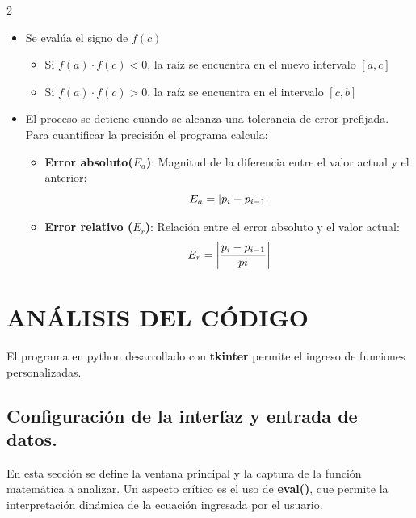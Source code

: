 \documentclass{rmf-d}
\begin{document}
\begin{multicols}{2}
\begin{itemize}
    \begin{equation}
        c = a + \frac{b-a}{2}
    \end{equation}
    \item Se evalúa el signo de $f(c)$
    \begin{itemize}
        \item Si $f(a) \cdot f(c)<0$, la raíz se encuentra en el nuevo intervalo $[a,c]$
        \item Si $f(a) \cdot f(c)>0$, la raíz se encuentra en el intervalo $[c,b]$
    \end{itemize}
    \item El proceso se detiene cuando se alcanza una tolerancia de error prefijada. Para cuantificar la precisión el programa calcula:
    \begin{itemize}
        \item \textbf{Error absoluto($E_a$)}: Magnitud de la diferencia entre el valor actual y el anterior:
        \begin{equation}
            E_a=\abs{p_i-p_{i-1}}
        \end{equation}
        \item \textbf{Error relativo ($E_r$)}: Relación entre el error absoluto y el valor actual:
        \begin{equation}
            E_r=\abs{\frac{p_i-p_{i-1}}{pi}}
        \end{equation}
    \end{itemize}
\end{itemize}





























\section{ANÁLISIS DEL CÓDIGO}
\label{sec:3}
El programa en python desarrollado con \textbf{tkinter} permite el ingreso de funciones personalizadas.

\subsection{Configuración de la interfaz y entrada de datos.}
En esta sección se define la ventana principal y la captura de la función matemática a analizar. Un aspecto crítico es el uso de \textbf{eval()}, que permite la interpretación dinámica de la ecuación ingresada por el usuario.


\end{multicols}
\end{document}
